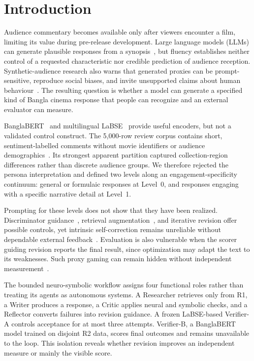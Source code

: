 \section{Introduction}
\label{sec:introduction}

Audience commentary becomes available only after viewers encounter a film, limiting its value during pre-release development. Large language models (LLMs) can generate plausible responses from a synopsis~\cite{b12}, but fluency establishes neither control of a requested characteristic nor credible prediction of audience reception. Synthetic-audience research also warns that generated proxies can be prompt-sensitive, reproduce social biases, and invite unsupported claims about human behaviour~\cite{b1}. The resulting question is whether a model can generate a specified kind of Bangla cinema response that people can recognize and an external evaluator can measure.

BanglaBERT~\cite{b2} and multilingual LaBSE~\cite{b3} provide useful encoders, but not a validated control construct. The 5,000-row review corpus contains short, sentiment-labelled comments without movie identifiers or audience demographics~\cite{b4}. Its strongest apparent partition captured collection-region differences rather than discrete audience groups. We therefore rejected the persona interpretation and defined two levels along an engagement-specificity continuum: general or formulaic responses at Level~0, and responses engaging with a specific narrative detail at Level~1.

Prompting for these levels does not show that they have been realized. Discriminator guidance~\cite{b11}, retrieval augmentation~\cite{b8}, and iterative revision offer possible controls, yet intrinsic self-correction remains unreliable without dependable external feedback~\cite{b5,b6}. Evaluation is also vulnerable when the scorer guiding revision reports the final result, since optimization may adapt the text to its weaknesses. Such proxy gaming can remain hidden without independent measurement~\cite{b7}.

The bounded neuro-symbolic workflow assigns four functional roles rather than treating its agents as autonomous systems. A Researcher retrieves only from R1, a Writer produces a response, a Critic applies neural and symbolic checks, and a Reflector converts failures into revision guidance. A frozen LaBSE-based Verifier-A controls acceptance for at most three attempts. Verifier-B, a BanglaBERT model trained on disjoint R2 data, scores final outcomes and remains unavailable to the loop. This isolation reveals whether revision improves an independent measure or mainly the visible score.

